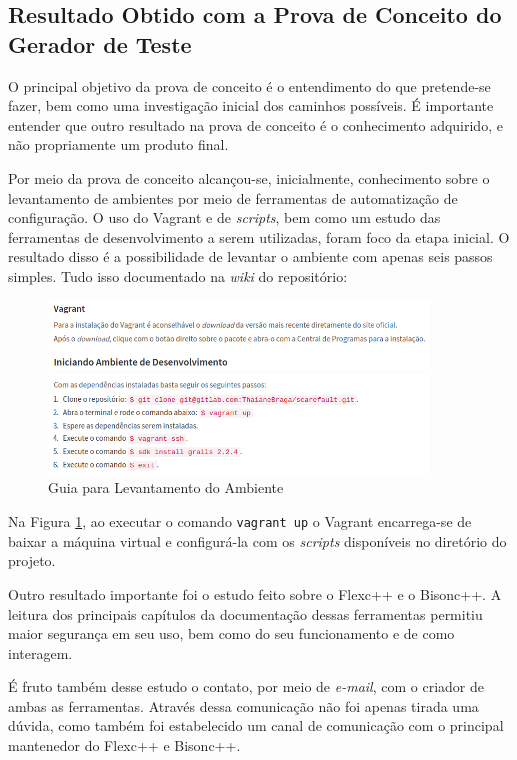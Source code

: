 \subsection{Resultado Obtido com a Prova de Conceito do Gerador de Teste}
O principal objetivo da prova de conceito é o entendimento do que pretende-se fazer, bem como uma investigação inicial dos caminhos possíveis. É importante entender que outro  resultado na prova de conceito é o conhecimento adquirido, e não propriamente um produto final.
\par
\indent Por meio da prova de conceito alcançou-se, inicialmente, conhecimento sobre o levantamento de ambientes por meio de ferramentas de automatização de configuração. O uso do Vagrant e de \textit{scripts}, bem como um estudo das ferramentas de desenvolvimento a serem utilizadas, foram foco da etapa inicial. O resultado disso é a possibilidade de levantar o ambiente com apenas seis passos simples. Tudo isso documentado na \textit{wiki}  do repositório:
\par
\begin{figure}[h]
    \centering
    \includegraphics[width=0.9\textwidth]{figuras/guide-vagrant.png}
    \caption{Guia para Levantamento do Ambiente}
    \label{fig:guide-vagrant}
 \end{figure}
\par
\indent Na Figura \ref{fig:guide-vagrant}, ao executar o comando \lstinline|vagrant up| o Vagrant encarrega-se de baixar a máquina virtual e configurá-la com os \textit{scripts} disponíveis no diretório do projeto.
\par
\indent Outro resultado importante foi o estudo feito sobre o Flexc++ e o Bisonc++. A leitura dos principais capítulos da documentação dessas ferramentas permitiu maior segurança em seu uso, bem como do seu funcionamento e de como interagem.
\par
\indent É fruto também desse estudo o contato, por meio de \textit{e-mail}, com o criador de ambas as ferramentas. Através dessa comunicação não foi apenas tirada uma dúvida, como também foi estabelecido um canal de comunicação com o principal mantenedor do Flexc++ e Bisonc++.
